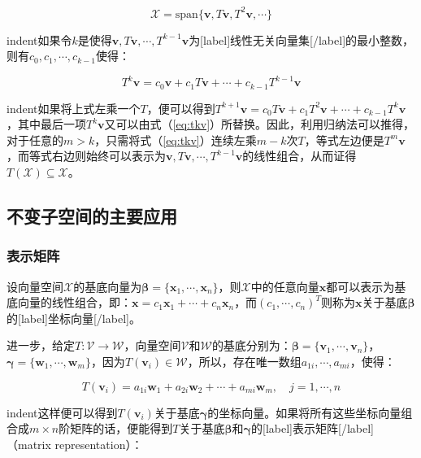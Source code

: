 \documentclass[UTF8,nofonts]{ctexart}
\begin{document}
\begin{equation}
\label{eq:cysp}\mathcal{X}=\text{span}\{\boldsymbol{v},T\boldsymbol{v},T^2\boldsymbol{v},\cdots\}
\end{equation}

indent如果令$k$是使得$\boldsymbol{v},T\boldsymbol{v},\cdots,T^{k-1}\boldsymbol{v}$为[label]线性无关向量集[/label]的最小整数，则有$c_0,c_1,\cdots,c_{k-1}$使得：

\begin{equation}
\label{eq:tkv}
T^k\boldsymbol{v}=c_0\boldsymbol{v}+c_1T\boldsymbol{v}+\cdots+c_{k-1}T^{k-1}\boldsymbol{v}
\end{equation}

indent如果将上式左乘一个$T$，便可以得到$T^{k+1}\boldsymbol{v}=c_0T\boldsymbol{v}+c_1T^2\boldsymbol{v}+\cdots+c_{k-1}T^k\boldsymbol{v}$，其中最后一项$T^k\boldsymbol{v}$又可以由式（\ref{eq:tkv}）所替换。因此，利用归纳法可以推得，对于任意的$m>k$，只需将式（\ref{eq:tkv}）连续左乘$m-k$次$T$，等式左边便是$T^m\boldsymbol{v}$，而等式右边则始终可以表示为$\boldsymbol{v},T\boldsymbol{v},\cdots,T^{k-1}\boldsymbol{v}$的线性组合，从而证得$T(\mathcal{X})\subseteq\mathcal{X}$。

\subsection*{不变子空间的主要应用}

\subsubsection*{表示矩阵}

设向量空间$\mathcal{X}$的基底向量为$\boldsymbol{\beta}=\{\boldsymbol{x}_1,\cdots,\boldsymbol{x}_n\}$，则$\mathcal{X}$中的任意向量$\boldsymbol{x}$都可以表示为基底向量的线性组合，即：$\boldsymbol{x}=c_1\boldsymbol{x}_1+\cdots+c_n\boldsymbol{x}_n$，而$(c_1,\cdots,c_n)^T$则称为$\boldsymbol{x}$关于基底$\boldsymbol{\beta}$的[label]坐标向量[/label]。

进一步，给定$T:\mathcal{V}\to\mathcal{W}$，向量空间$\mathcal{V}$和$\mathcal{W}$的基底分别为：$\boldsymbol{\beta}=\{\boldsymbol{v}_1,\cdots,\boldsymbol{v}_n\}$，$\boldsymbol{\gamma}=\{\boldsymbol{w}_1,\cdots,\boldsymbol{w}_m\}$，因为$T(\boldsymbol{v}_i)\in\mathcal{W}$，所以，存在唯一数组$a_{1i},\cdots,a_{mi}$，使得：

\[
T(\boldsymbol{v}_i)=a_{1i}\boldsymbol{w}_1+a_{2i}\boldsymbol{w}_2+\cdots+a_{mi}\boldsymbol{w}_m,\quad j=1,\cdots,n
\]

indent这样便可以得到$T(\boldsymbol{v}_i)$关于基底$\boldsymbol{\gamma}$的坐标向量。如果将所有这些坐标向量组合成$m \times n$阶矩阵的话，便能得到$T$关于基底$\boldsymbol{\beta}$和$\boldsymbol{\gamma}$的[label]表示矩阵[/label]（matrix representation）：
\end{document}
